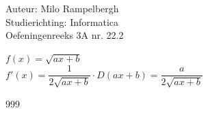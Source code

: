 \documentclass[a4paper]{article}
\newcommand{\fx}{ \sqrt{ax+b} }
\begin{document}
\noindent \large Auteur: Milo Rampelbergh \\
\noindent \large Studierichting: Informatica\\
\noindent \large Oefeningenreeks 3A nr. 22.2\\

\medskip

\normalsize


$ f(x) = \fx $ \\

$ f'(x) = \dfrac{1}{2\sqrt{ax+b}} \cdot D(ax+b) = \dfrac{a}{2\sqrt{ax+b}} $ \\


\begin{thebibliography}{999}
\end{thebibliography}
\end{document}
